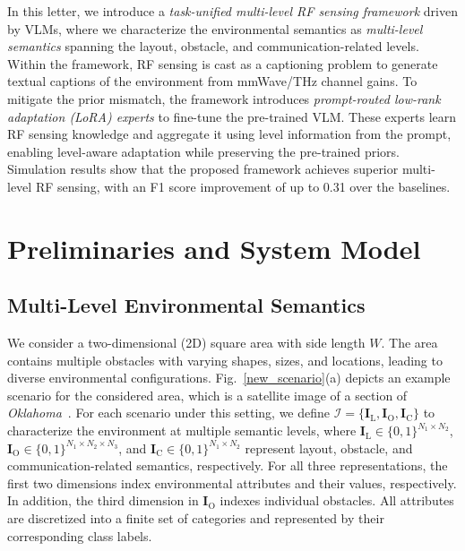 \documentclass[journal,10pt,twocolumn]{IEEEtran}
\newcommand\IC{\ensuremath{\mathcal{I}}}
\newcommand\FIF{\ensuremath{\mathbf{I}}}
\newcommand\CR{\ensuremath{\mathrm{C}}}
\newcommand\LR{\ensuremath{\mathrm{L}}}
\newcommand\ROR{\ensuremath{\mathrm{O}}}
\begin{document}
In this letter, we introduce a \emph{task-unified multi-level RF sensing framework} driven by VLMs, where we characterize the environmental semantics as \emph{multi-level semantics} spanning the layout, obstacle, and communication-related levels. Within the framework, RF sensing is cast as a captioning problem to generate textual captions of the environment from mmWave/THz channel gains. To mitigate the prior mismatch, the framework introduces \emph{prompt-routed low-rank adaptation (LoRA) experts} to fine-tune the pre-trained VLM. These experts learn RF sensing knowledge and aggregate it using level information from the prompt, enabling level-aware adaptation while preserving the pre-trained priors. Simulation results show that the proposed framework achieves superior multi-level RF sensing, with an F1 score improvement of up to 0.31 over the baselines.



\section{Preliminaries and System Model}

\subsection{Multi-Level Environmental Semantics}

We consider a two-dimensional (2D) square area with side length $W$. The area contains multiple obstacles with varying shapes, sizes, and locations, leading to diverse environmental configurations. Fig.~\ref{new_scenario}(a) depicts an example scenario for the considered area, which is a satellite image of a section of {\it Oklahoma}~\cite{Alkhateeb2019}. For each scenario under this setting, we define
$\IC=\{\FIF_{\LR},\FIF_{\ROR},\FIF_{\CR}\}$ to characterize the environment at multiple semantic levels,
where $\FIF_{\LR}\in\{0,1\}^{N_{1}\times N_{2}}$, $\FIF_{\ROR}\in\{0,1\}^{N_{1}\times N_{2}\times N_{3}}$, and $\FIF_{\CR}\in\{0,1\}^{N_{1}\times N_{2}}$ represent layout, obstacle, and communication-related semantics, respectively. For all three representations, the first two dimensions index environmental attributes and their values, respectively. In addition, the third dimension in $\FIF_{\ROR}$ indexes individual obstacles. All attributes are discretized into a finite set of categories and represented by their corresponding class labels.
\end{document}
